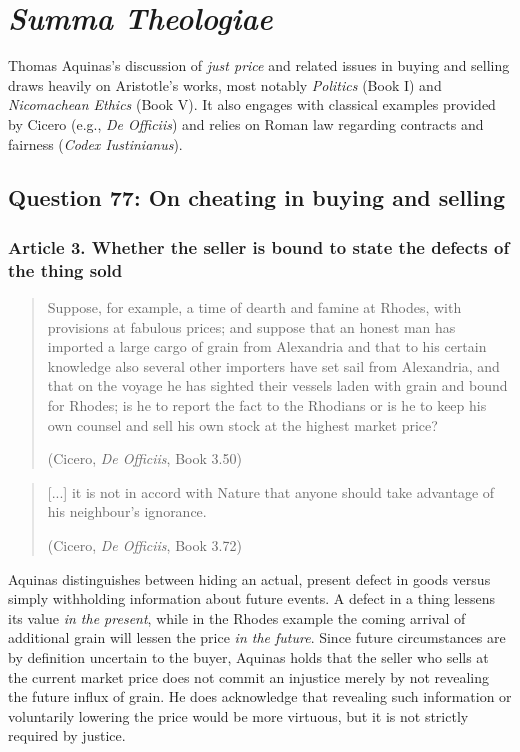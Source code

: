 \section{\textit{Summa Theologiae}}

    \begin{remark}
        Thomas Aquinas’s discussion of \textit{just price} and related issues in buying and selling draws heavily on Aristotle’s works, most notably \textit{Politics} (Book I) and \textit{Nicomachean Ethics} (Book V). It also engages with classical examples provided by Cicero (e.g., \textit{De Officiis}) and relies on Roman law regarding contracts and fairness (\textit{Codex Iustinianus}).
    \end{remark}

    \subsection{Question 77: On cheating in buying and selling}

        \subsubsection{Article 3. Whether the seller is bound to state the defects of the thing sold}

            \begin{quote}
                Suppose, for example, a time of dearth and famine at Rhodes, with provisions at fabulous prices; and suppose that an honest man has imported a large cargo of grain from Alexandria and that to his certain knowledge also several other importers have set sail from Alexandria, and that on the voyage he has sighted their vessels laden with grain and bound for Rhodes; is he to report the fact to the Rhodians or is he to keep his own counsel and sell his own stock at the highest market price?
            
                (Cicero, \textit{De Officiis}, Book 3.50)
            \end{quote}
    
            \begin{quote}
                [...] it is not in accord with Nature that anyone should take advantage of his neighbour’s ignorance.
            
                (Cicero, \textit{De Officiis}, Book 3.72)
            \end{quote}
    
            Aquinas distinguishes between hiding an actual, present defect in goods versus simply withholding information about future events. A defect in a thing lessens its value \emph{in the present}, while in the Rhodes example the coming arrival of additional grain will lessen the price \emph{in the future}. Since future circumstances are by definition uncertain to the buyer, Aquinas holds that the seller who sells at the current market price does not commit an injustice merely by not revealing the future influx of grain. He does acknowledge that revealing such information or voluntarily lowering the price would be more virtuous, but it is not strictly required by justice.
    
